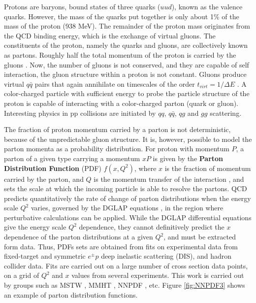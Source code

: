 \documentclass[11pt,a4paper,openright,twoside]{report}
\begin{document}
Protons are baryons, bound states of three quarks ($uud$), known as the valence quarks. However, the mass of the quarks put together is only about 1\% of the mass of the proton (938 MeV). The remainder of the proton mass originates from the QCD binding energy, which is the exchange of virtual gluons. The constituents of the proton, namely the quarks and gluons, are collectively known as partons. Roughly half the total momentum of the proton is carried by the gluons \cite{quarks_and_leptons}. Now, the number of gluons is not conserved, and they are capable of self interaction, the gluon structure within a proton is not constant. Gluons produce virtual $q\bar{q}$ pairs that again annihilate on timescales of the order $t_{virt}=1/\Delta E$ \cite{collider_physics}. A color-charged particle with sufficient energy to probe the particle structure of the proton is capable of interacting with a color-charged parton (quark or gluon). Interesting physics in pp collisions are initiated by $qq$, $q\bar{q}$, $qg$ and $gg$ scattering.

The fraction of proton momentum carried by a parton is not deterministic, because of the unpredictable gluon structure. It is, however, possible to model the parton momenta as a probability distribution. For proton with momentum $P$, a parton  of a given type carrying a momentum $xP$ is given by the \textbf{Parton Distribution Function} (PDF) $f(x,Q^2)$, where $x$ is the fraction of momentum carried by the parton, and $Q$ is the momentum transfer of the interaction \cite{collider_physics}, and sets the scale at which the incoming particle is able to resolve the partons. QCD predicts quantitatively the rate of change of parton distributions when the energy scale $Q^2$ varies, governed by the DGLAP equations \cite{DGLAP}, in the region where perturbative calculations can be applied. While the DGLAP differential equations give the energy scale $Q^2$ dependence, they cannot definitively predict the $x$ dependence of the parton distributions at a given $Q^2$, and must be extracted form data. Thus, PDFs sets are obtained from fits on experimental data from fixed-target and symmetric $e^\pm p$ deep inelastic scattering (DIS), and hadron collider data. Fits are carried out on a large number of cross section data points, on a grid of $Q^2$ and $x$ values from several experiments. This work is carried out by groups such as  MSTW \cite{MSTW, MSTW2, MSTW3}, MMHT \cite{MMHT14}, NNPDF \cite{NNPDF}, etc. Figure \ref{fig:NNPDF3} shows an example of parton distribution functions.
\end{document}
